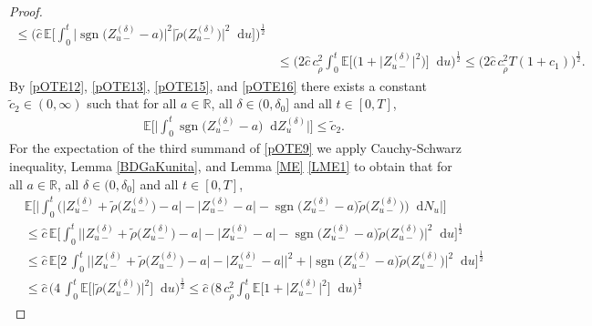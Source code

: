 \documentclass[11pt,a4paper]{article}
\numberwithin{equation}{section}
\theoremstyle{definition}
\newcommand{\E}{{\mathbb{E}}}
\newcommand{\R}{{\mathbb{R}}}
\newcommand{\diff}{\mathop{}\!\mathrm{d}}
\begin{document}
\begin{proof}
\begin{equation}
\begin{aligned}
    \leq \Big(\hat c\,\E\Big[\int_0^t\big| \operatorname{sgn}\big(Z^{(\delta)}_{u-} -a\big)\big|^2\big|\widetilde\rho\big(Z^{(\delta)}_{u-}\big)\big|^2 \diff u\Big]\Big)^\frac{1}{2}\\
    &\leq \Big( 2\hat c\, c_{\widetilde\rho}^2 \int_0^t\E\Big[ \big( 1+ \big|Z^{(\delta)}_{u-}\big|^2\big) \Big]\diff u\Big)^\frac{1}{2}
    \leq \big(2\hat c\, c_{\widetilde\rho}^2  T ( 1+ c_1)\big)^\frac{1}{2}.
    \end{aligned}
\end{equation}
By \eqref{pOTE12}, \eqref{pOTE13}, \eqref{pOTE15}, and \eqref{pOTE16} there exists a constant $\widetilde c_2\in(0,\infty)$ such that for all $a\in\R$, all $\delta \in(0,\delta_0]$ and all $t\in[0,T]$,
\begin{equation}\label{pOTE17}
    \begin{aligned}
    &\E\Big[\Big|\int_0^t \operatorname{sgn}\big(Z^{(\delta)}_{u-} -a\big) \diff Z^{(\delta)}_{u}\Big|\Big]
    \leq \widetilde c_2.
    \end{aligned}
\end{equation}
For the expectation of the third summand of \eqref{pOTE9} we apply Cauchy-Schwarz inequality, Lemma \ref{BDGaKunita}, and Lemma  \ref{ME} \eqref{LME1} to obtain that for all $a\in\R$, all $\delta \in(0,\delta_0]$ and all $t\in[0,T]$,
\begin{equation}\label{pOTE18}
    \begin{aligned}
    & \E\Big[\Big|\int_0^t \Big( \big| Z^{(\delta)}_{u-} + \widetilde\rho\big(Z^{(\delta)}_{u-}\big)- a\big| - \big| Z^{(\delta)}_{u-} - a\big| - \operatorname{sgn}\big(Z^{(\delta)}_{u-} -a\big) \widetilde\rho\big(Z^{(\delta)}_{u-}\big)\Big) \diff N_u
    \Big|\Big]\\
    &\leq \hat c\, \E\Big[\int_0^t \Big| \big| Z^{(\delta)}_{u-} + \widetilde\rho\big(Z^{(\delta)}_{u-}\big)- a\big| - \big| Z^{(\delta)}_{u-} - a\big| - \operatorname{sgn}\big(Z^{(\delta)}_{u-} -a\big) \widetilde\rho\big(Z^{(\delta)}_{u-}\big)\Big|^2 \diff u
    \Big]^\frac{1}{2}\\
    &\leq \hat c\, \E\Big[2\, \int_0^t \Big| \big| Z^{(\delta)}_{u-} + \widetilde\rho\big(Z^{(\delta)}_{u-}\big)- a\big| - \big| Z^{(\delta)}_{u-} - a\big|\Big|^2 + \Big| \operatorname{sgn}\big(Z^{(\delta)}_{u-} -a\big) \widetilde\rho\big(Z^{(\delta)}_{u-}\big)\Big|^2 \diff u
    \Big]^\frac{1}{2}\\
    &\leq \hat c\, \Big(4\, \int_0^t \E\Big[ \big|\widetilde\rho\big(Z^{(\delta)}_{u-}\big)\big|^2\Big]\diff u\Big)^\frac{1}{2}
    \leq \hat c\, \Big(8\,c_{\widetilde\rho}^2 \int_0^t \E\Big[ 1+ \big|Z^{(\delta)}_{u-}\big|^2\Big]\diff u\Big)^\frac{1}{2}

\end{aligned}
\end{equation}
\end{proof}
\end{document}
